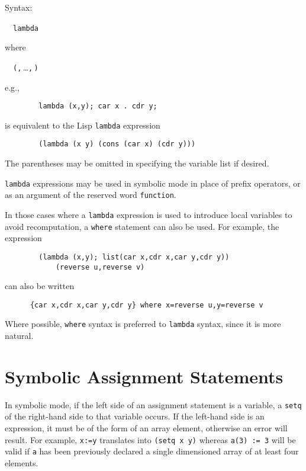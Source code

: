 Syntax:
\begin{syntax}
  \ \BNFprod\
    \texttt{lambda } 
\end{syntax}
 where
\begin{syntax}
  \ \BNFprod\ \texttt{(}\texttt{,}\,\dots\texttt{,}\,\texttt{)}
\end{syntax}
e.g.,
\begin{verbatim}
        lambda (x,y); car x . cdr y;
\end{verbatim}
is equivalent to the Lisp \texttt{lambda} expression
\begin{verbatim}
        (lambda (x y) (cons (car x) (cdr y)))
\end{verbatim}
The parentheses may be omitted in specifying the variable list if desired.

\texttt{lambda} expressions may be used in symbolic mode in place of prefix
operators, or as an argument of the reserved word \hypertarget{reserved:FUNCTION}{\texttt{function}}.

In those cases where a \texttt{lambda} expression is used to introduce local
variables to avoid recomputation, a \texttt{where} statement can also be
used.  For example, the expression
\begin{verbatim}
        (lambda (x,y); list(car x,cdr x,car y,cdr y))
            (reverse u,reverse v)
\end{verbatim}
can also be written
\begin{verbatim}
      {car x,cdr x,car y,cdr y} where x=reverse u,y=reverse v
\end{verbatim}
Where possible, \texttt{where} syntax is preferred to \texttt{lambda} syntax,
since it is more natural.

\section{Symbolic Assignment Statements}
\hypertarget{command:SETQ}{}

In symbolic mode, if the left side of an assignment statement is a
variable, a \texttt{setq} of the right-hand side to that variable occurs.  If
the left-hand side is an expression, it must be of the form of an array
element, otherwise an error will result.  For example, \texttt{x:=y}
translates into \texttt{(setq x y)} whereas \texttt{a(3) := 3} will be valid if
\texttt{a} has been previously declared a single dimensioned array of at
least four elements.

